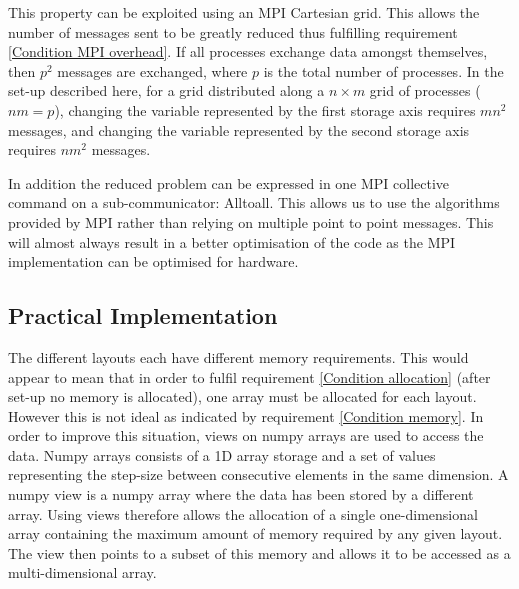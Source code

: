 This property can be exploited using an MPI Cartesian grid. This allows the number of messages sent to be greatly reduced thus fulfilling requirement \ref{Condition MPI overhead}. If all processes exchange data amongst themselves, then $p^2$ messages are exchanged,  where $p$ is the total number of processes. In the set-up described here, for a grid distributed along a $n \times m$ grid of processes ($nm=p$), changing the variable represented by the first storage axis requires $m n^2$ messages, and changing the variable represented by the second storage axis requires $n m^2$ messages.

In addition the reduced problem can be expressed in one MPI collective command on a sub-communicator: Alltoall. This allows us to use the algorithms provided by MPI rather than relying on multiple point to point messages. This will almost always result in a better optimisation of the code as the MPI implementation can be optimised for hardware.

\subsection{Practical Implementation}

The different layouts each have different memory requirements. This would appear to mean that in order to fulfil requirement \ref{Condition allocation} (after set-up no memory is allocated), one array must be allocated for each layout. However this is not ideal as indicated by requirement \ref{Condition memory}. In order to improve this situation, views on numpy arrays are used to access the data. Numpy arrays consists of a 1D array storage and a set of values representing the step-size between consecutive elements in the same dimension. A numpy view is a numpy array where the data has been stored by a different array. Using views therefore allows the allocation of a single one-dimensional array containing the maximum amount of memory required by any given layout. The view then points to a subset of this memory and allows it to be accessed as a multi-dimensional array.

